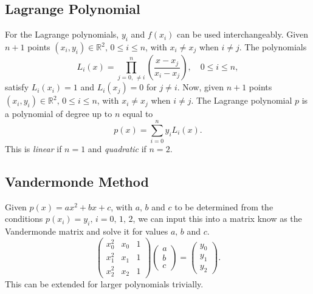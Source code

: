 \documentclass{article}
\begin{document}
\subsection{Lagrange Polynomial}
For the Lagrange polynomials, $y_i$ and $f(x_i)$ can be used interchangeably.
Given $n+1$ points $(x_i,y_i) \in \mathbb{R}^2,\,0\leq i\leq n$, with $x_i\neq x_j$ when $i\neq j$. The polynomials
\begin{equation}
    L_i(x) = \prod_{j=0,\,\neq i}^n \left(\frac{x-x_j}{x_i-x_j}\right),\quad 0\leq i \leq n,
\end{equation}
satisfy $L_i(x_i)=1$ and $L_i(x_j)=0$ for $j\neq i$.
Now, given $n+1$ points $(x_i,y_i) \in \mathbb{R}^2,\,0\leq i\leq n$, with $x_i\neq x_j$ when $i\neq j$. The Lagrange polynomial $p$ is a polynomial of degree up to $n$ equal to
\begin{equation}
    p(x) = \sum_{i=0}^n y_iL_i(x).
\end{equation}
This is \textit{linear} if $n=1$ and \textit{quadratic} if $n=2$.
\subsection{Vandermonde Method}
Given $p(x)=ax^2+bx+c$, with $a,\,b$ and $c$ to be determined from the conditions $p(x_i)=y_i,\, i=0,\,1,\,2$, we can input this into a matrix know as the Vandermonde matrix and solve it for values $a,\,b$ and $c$.
\begin{equation}
    \begin{pmatrix}  x_0^2 & x_0 & 1 \\ x_1^2 & x_1 & 1 \\ x_2^2 & x_2 & 1 \end{pmatrix}\begin{pmatrix} a \\ b \\ c \end{pmatrix} = \begin{pmatrix} y_0 \\ y_1 \\ y_2 \end{pmatrix}.
\end{equation}
This can be extended for larger polynomials trivially.
\end{document}
